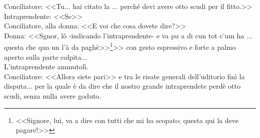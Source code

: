 \indent Conciliatore: <<Tu... hai citato la .\:.\:. perché devi avere otto scudi per il fitto.>>\\
\indent Intraprendente: <<Se>>\\
\indent Conciliatore, alla donna: <<E voi che cosa dovete dire?>>\\
\indent Donna: <<Sgnor, lò -indicando l'intraprendente- e va pu a di cun tot c'um ha .\:.\:. questa che qua un l'à da paghè>>\footnote{<<Signore, lui, va a dire con tutti che mi ha scopato; questa qui la deve pagare!>>}>> con gesto espressivo e forte a palmo aperto sulla parte colpita...\\
\indent L'intraprendente ammutolì.\\
\indent Conciliatore: <<Allora siete pari>> e tra le risate generali dell'uditorio finì la disputa... per la quale è da dire che il nostro grande intraprendete perdè otto scudi, senza nulla avere goduto. 



